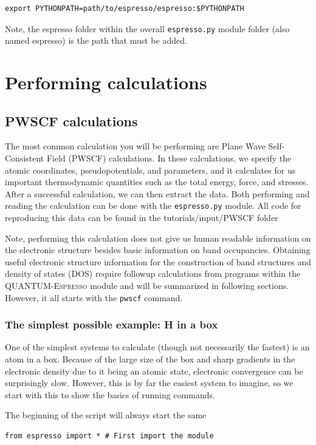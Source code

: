 \documentclass[colorlinks=true,urlcolor=blue,linkcolor=blue,citecolor=red]{article}
\begin{document}
\begin{verbatim}
export PYTHONPATH=path/to/espresso/espresso:$PYTHONPATH
\end{verbatim}

Note, the espresso folder within the overall \texttt{espresso.py} module folder (also named espresso) is the path that must be added.

\section{Performing calculations}
\label{sec-3}
\subsection{PWSCF calculations}
\label{sec-3-1}
The most common calculation you will be performing are Plane Wave Self-Consistent Field (PWSCF) calculations. In these calculations, we specify the atomic coordinates, pseudopotentials, and parameters, and it calculates for us important thermodynamic quantities such as the total energy, force, and stresses. After a successful calculation, we can then extract the data. Both performing and reading the calculation can be done with the \texttt{espresso.py} module. All code for reproducing this data can be found in the tutorials/input/PWSCF folder

Note, performing this calculation does not give us human readable information on the electronic structure besides basic information on band occupancies. Obtaining useful electronic structure information for the construction of band structures and density of states (DOS) require followup calculations from programs within the \textsc{QUANTUM-Espresso} module and will be summarized in following sections. However, it all starts with the \texttt{pwscf} command.

\subsubsection{The simplest possible example: H in a box}
\label{sec-3-1-1}
One of the simplest systems to calculate (though not necessarily the fastest) is an atom in a box. Because of the large size of the box and sharp gradients in the electronic density due to it being an atomic state, electronic convergence can be surprisingly slow. However, this is by far the easiest system to imagine, so we start with this to show the basics of running commands.

The beginning of the script will always start the same
\begin{verbatim}
from espresso import * # First import the module
\end{verbatim}
\end{document}
